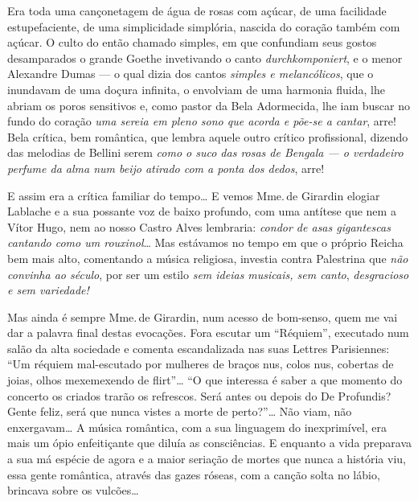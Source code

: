 Era toda uma cançonetagem de água de rosas com açúcar, de uma facilidade
estupefaciente, de uma simplicidade simplória, nascida do coração também
com açúcar. O culto do então chamado simples, em que confundiam seus
gostos desamparados o grande Goethe invetivando o canto
\textit{durchkomponiert}, e o menor Alexandre Dumas --- o qual dizia dos
cantos \textit{simples e melancólicos}, que o inundavam de uma doçura
infinita, o envolviam de uma harmonia fluida, lhe abriam os poros
sensitivos e, como pastor da Bela Adormecida, lhe iam buscar no fundo do
coração \textit{uma sereia em pleno sono que acorda e põe-se a cantar}, arre!
Bela crítica, bem romântica, que lembra aquele outro crítico
profissional, dizendo das melodias de Bellini serem \textit{como o suco das
rosas de Bengala --- o verdadeiro perfume da alma num beijo atirado com a
ponta dos dedos}, arre!

E assim era a crítica familiar do tempo\ldots{} E vemos Mme.\,de Girardin
elogiar Lablache e a sua possante voz de baixo profundo, com uma
antítese que nem a Vítor Hugo, nem ao nosso Castro Alves lembraria:
\textit{condor de asas gigantescas cantando como um rouxinol}\ldots{} Mas
estávamos no tempo em que o próprio Reicha bem mais alto, comentando a
música religiosa, investia contra Palestrina que \textit{não convinha ao
século}, por ser um estilo \textit{sem ideias musicais, sem canto},
\textit{desgracioso e sem variedade!}

Mas ainda é sempre Mme.\,de Girardin, num acesso de bom-senso, quem me
vai dar a palavra final destas evocações. Fora escutar um ``Réquiem'',
executado num salão da alta sociedade e comenta escandalizada nas suas
Lettres Parisiennes: ``Um réquiem mal-escutado por mulheres de braços
nus, colos nus, cobertas de joias, olhos mexemexendo de flirt''\ldots{} ``O
que interessa é saber a que momento do concerto os criados trarão os
refrescos. Será antes ou depois do De Profundis? Gente feliz, será que
nunca vistes a morte de perto?''\ldots{} Não viam, não enxergavam\ldots{} A música
romântica, com a sua linguagem do inexprimível, era mais um ópio
enfeitiçante que diluía as consciências. E enquanto a vida preparava a
sua má espécie de agora e a maior seriação de mortes que nunca a
história viu, essa gente romântica, através das gazes róseas, com a
canção solta no lábio, brincava sobre os vulcões\ldots{}



